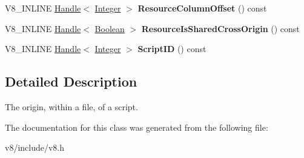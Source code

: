\begin{DoxyCompactItemize}
\item 
\hypertarget{classv8_1_1ScriptOrigin_a6d1b4cb1be2b6589151a029974cd1a60}{}V8\+\_\+\+I\+N\+L\+I\+N\+E \hyperlink{classv8_1_1Handle}{Handle}$<$ \hyperlink{classv8_1_1Integer}{Integer} $>$ {\bfseries Resource\+Column\+Offset} () const \label{classv8_1_1ScriptOrigin_a6d1b4cb1be2b6589151a029974cd1a60}

\item 
\hypertarget{classv8_1_1ScriptOrigin_a632d2d30405d42512af609861e486bf2}{}V8\+\_\+\+I\+N\+L\+I\+N\+E \hyperlink{classv8_1_1Handle}{Handle}$<$ \hyperlink{classv8_1_1Boolean}{Boolean} $>$ {\bfseries Resource\+Is\+Shared\+Cross\+Origin} () const \label{classv8_1_1ScriptOrigin_a632d2d30405d42512af609861e486bf2}

\item 
\hypertarget{classv8_1_1ScriptOrigin_abc222706ba9cdd48f8efaf4be227c078}{}V8\+\_\+\+I\+N\+L\+I\+N\+E \hyperlink{classv8_1_1Handle}{Handle}$<$ \hyperlink{classv8_1_1Integer}{Integer} $>$ {\bfseries Script\+I\+D} () const \label{classv8_1_1ScriptOrigin_abc222706ba9cdd48f8efaf4be227c078}

\end{DoxyCompactItemize}


\subsection{Detailed Description}
The origin, within a file, of a script. 

The documentation for this class was generated from the following file\+:\begin{DoxyCompactItemize}
\item 
v8/include/v8.\+h\end{DoxyCompactItemize}
